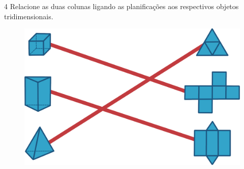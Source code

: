 \begin{emptybox}
\end{emptybox}

\pagebreak
\num{4} Relacione as duas colunas ligando as planificações aos respectivos
objetos tridimensionais.

\begin{figure}[htpb!]
\centering
\includegraphics[width=\textwidth]{./ilustras-mat/modulo_10-atividade_4_resposta.png}
\end{figure}

